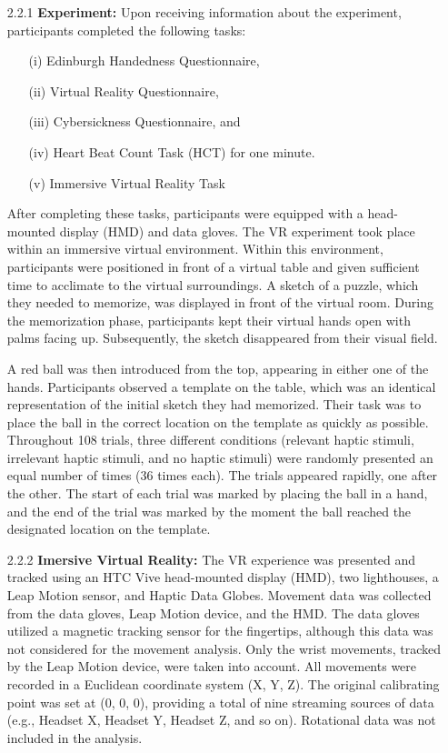 \documentclass[12pt,oneside,openright]{report}
\begin{document}
  \begin{enumerate}
    \item[2.2.1] \textbf{Experiment:} Upon receiving information about the experiment, participants completed the following tasks:
    \begin{enumerate}
      \item[(i)] Edinburgh Handedness Questionnaire,
      \item[(ii)] Virtual Reality Questionnaire,
      \item[(iii)] Cybersickness Questionnaire, and
      \item[(iv)] Heart Beat Count Task (HCT) for one minute.
      \item[(v)] Immersive Virtual Reality Task   
    \end{enumerate}
    After completing these tasks, participants were equipped with a head-mounted display (HMD) and data gloves. The VR experiment took place within an immersive virtual environment. Within this environment, participants were positioned in front of a virtual table and given sufficient time to acclimate to the virtual surroundings. A sketch of a puzzle, which they needed to memorize, was displayed in front of the virtual room. During the memorization phase, participants kept their virtual hands open with palms facing up. Subsequently, the sketch disappeared from their visual field.

    A red ball was then introduced from the top, appearing in either one of the hands. Participants observed a template on the table, which was an identical representation of the initial sketch they had memorized. Their task was to place the ball in the correct location on the template as quickly as possible. Throughout 108 trials, three different conditions (relevant haptic stimuli, irrelevant haptic stimuli, and no haptic stimuli) were randomly presented an equal number of times (36 times each). The trials appeared rapidly, one after the other. The start of each trial was marked by placing the ball in a hand, and the end of the trial was marked by the moment the ball reached the designated location on the template.

    \item[2.2.2] \textbf{Imersive Virtual Reality:} The VR experience was presented and tracked using an HTC Vive head-mounted display (HMD), two lighthouses, a Leap Motion sensor, and Haptic Data Globes. Movement data was collected from the data gloves, Leap Motion device, and the HMD. The data gloves utilized a magnetic tracking sensor for the fingertips, although this data was not considered for the movement analysis. Only the wrist movements, tracked by the Leap Motion device, were taken into account. All movements were recorded in a Euclidean coordinate system (X, Y, Z). The original calibrating point was set at (0, 0, 0), providing a total of nine streaming sources of data (e.g., Headset X, Headset Y, Headset Z, and so on). Rotational data was not included in the analysis.


\end{enumerate}
\end{document}
